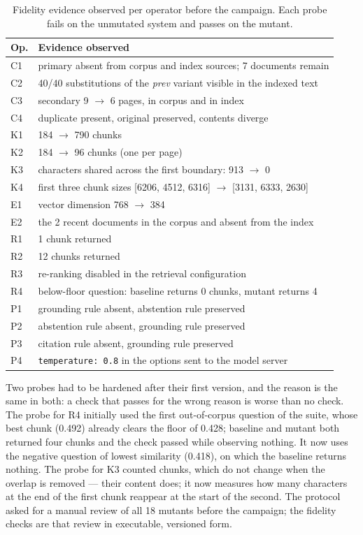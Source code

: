 \documentclass[a4paper,fleqn]{cas-dc}
\newcommand{\code}[1]{\texttt{#1}}
\begin{document}
\begin{table}[width=\linewidth,cols=2,pos=h]
\caption{Fidelity evidence observed per operator before the campaign. Each
probe fails on the unmutated system and passes on the mutant.}
\label{tab:fidelity}
\begin{tabular*}{\tblwidth}{@{} LL @{}}
\toprule
Op. & Evidence observed \\
\midrule
C1 & primary absent from corpus and index sources; 7 documents remain \\
C2 & 40/40 substitutions of the \emph{prev} variant visible in the indexed text \\
C3 & secondary 9 $\rightarrow$ 6 pages, in corpus and in index \\
C4 & duplicate present, original preserved, contents diverge \\
K1 & 184 $\rightarrow$ 790 chunks \\
K2 & 184 $\rightarrow$ 96 chunks (one per page) \\
K3 & characters shared across the first boundary: 913 $\rightarrow$ 0 \\
K4 & first three chunk sizes [6206, 4512, 6316] $\rightarrow$ [3131, 6333, 2630] \\
E1 & vector dimension 768 $\rightarrow$ 384 \\
E2 & the 2 recent documents in the corpus and absent from the index \\
R1 & 1 chunk returned \\
R2 & 12 chunks returned \\
R3 & re-ranking disabled in the retrieval configuration \\
R4 & below-floor question: baseline returns 0 chunks, mutant returns 4 \\
P1 & grounding rule absent, abstention rule preserved \\
P2 & abstention rule absent, grounding rule preserved \\
P3 & citation rule absent, grounding rule preserved \\
P4 & \code{temperature: 0.8} in the options sent to the model server \\
\bottomrule
\end{tabular*}
\end{table}

Two probes had to be hardened after their first version, and the reason is the
same in both: a check that passes for the wrong reason is worse than no check.
The probe for R4 initially used the first out-of-corpus question of the suite,
whose best chunk (0.492) already clears the floor of 0.428; baseline and mutant
both returned four chunks and the check passed while observing nothing. It now
uses the negative question of lowest similarity (0.418), on which the baseline
returns nothing. The probe for K3 counted chunks, which do not change when the
overlap is removed --- their content does; it now measures how many characters
at the end of the first chunk reappear at the start of the second. The
protocol asked for a manual review of all 18 mutants before the campaign; the
fidelity checks are that review in executable, versioned form.
\end{document}
